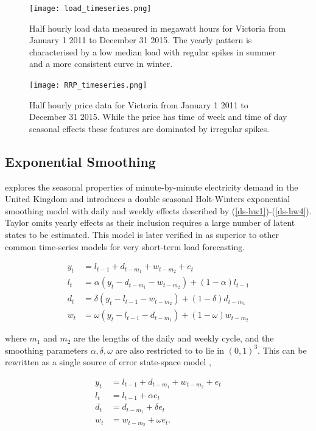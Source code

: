 \documentclass[12pt,a4paper]{article}%
\numberwithin{equation}{section}
\begin{document}
\begin{figure}[h]
\centering
\texttt{[image: load\_timeseries.png]}
\caption{Half hourly load data measured in megawatt hours for Victoria from January 1 2011 to December 31 2015. The yearly pattern is characterised by a low median load with regular spikes in summer and a more consistent curve in winter.}
\label{loadplot}
\end{figure}

\begin{figure}[h]
\centering
\texttt{[image: RRP\_timeseries.png]}
\caption{Half hourly price data for Victoria from January 1 2011 to December 31 2015. While the price has time of week and time of day seasonal effects these features are dominated by irregular spikes.}
\label{rrpplot}
\end{figure}

\subsection{Exponential Smoothing}

\citet{Taylor2003} explores the seasonal properties of minute-by-minute electricity demand in the United Kingdom and introduces a double seasonal Holt-Winters exponential smoothing model with daily and weekly effects described by (\ref{ds-hw1})-(\ref{ds-hw4}). Taylor omits yearly effects as their inclusion requires a large number of latent states to be estimated. This model is later verified in \citet{Taylor2008} as superior to other common time-series models for very short-term load forecasting.

\begin{align}
y_t &= l_{t-1} + d_{t-m_1} + w_{t-m_2} + e_t \label{ds-hw1} \\
l_t &= \alpha (y_t - d_{t-m_1} - w_{t-m_2}) + (1 - \alpha)l_{t-1} \label{ds-hw2}\\
d_t &= \delta (y_t - l_{t-1} - w_{t-m_2}) + (1 - \delta)d_{t-m_1} \label{ds-hw3} \\
w_t &= \omega (y_t - l_{t-1} - d_{t-m_1}) + (1 - \omega)w_{t-m_2} \label{ds-hw4}
\end{align}

where $m_1$ and $m_2$ are the lengths of the daily and weekly cycle, and the smoothing parameters $\alpha, \delta, \omega$ are also restricted to to lie in $(0, 1)^3$. This can be rewritten as a single source of error state-space model \citep{Snyder1985},

\begin{align}
y_t &= l_{t-1} + d_{t-m_1} + w_{t-m_2} + e_t \label{ds-hw-ssoe1} \\
l_t &= l_{t-1} + \alpha e_t \label{ds-hw-ssoe2} \\
d_t &= d_{t-m_1} + \delta e_t \label{ds-hw-ssoe3} \\
w_t &= w_{t-m_2} + \omega e_t \label{ds-hw-ssoe4}. 
\end{align}
\end{document}
